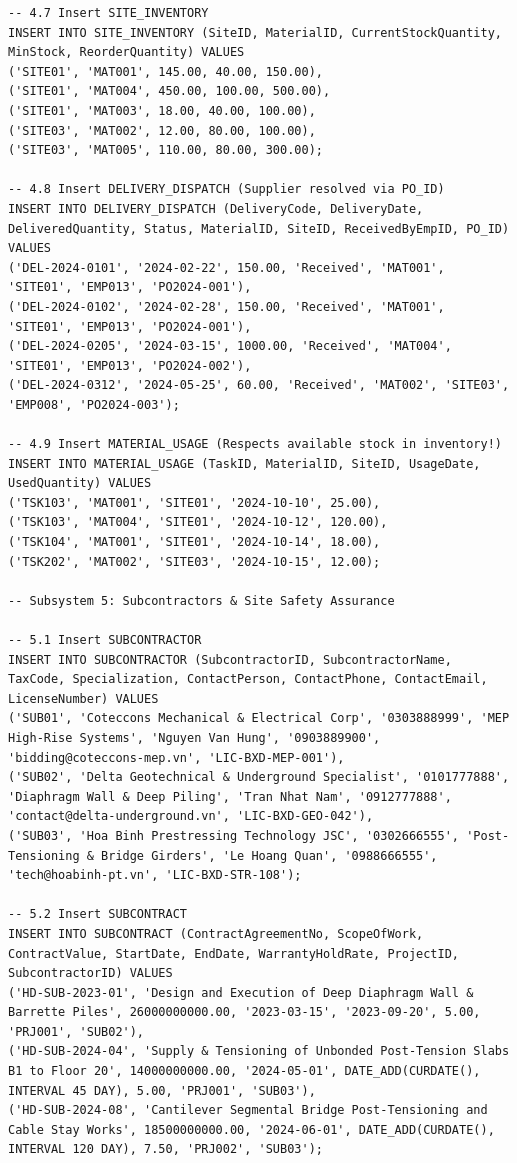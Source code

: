 \documentclass[a4paper,12pt]{report}
\begin{document}
\begin{lstlisting}
-- 4.7 Insert SITE_INVENTORY
INSERT INTO SITE_INVENTORY (SiteID, MaterialID, CurrentStockQuantity, MinStock, ReorderQuantity) VALUES
('SITE01', 'MAT001', 145.00, 40.00, 150.00),
('SITE01', 'MAT004', 450.00, 100.00, 500.00),
('SITE01', 'MAT003', 18.00, 40.00, 100.00),
('SITE03', 'MAT002', 12.00, 80.00, 100.00),
('SITE03', 'MAT005', 110.00, 80.00, 300.00);

-- 4.8 Insert DELIVERY_DISPATCH (Supplier resolved via PO_ID)
INSERT INTO DELIVERY_DISPATCH (DeliveryCode, DeliveryDate, DeliveredQuantity, Status, MaterialID, SiteID, ReceivedByEmpID, PO_ID) VALUES
('DEL-2024-0101', '2024-02-22', 150.00, 'Received', 'MAT001', 'SITE01', 'EMP013', 'PO2024-001'),
('DEL-2024-0102', '2024-02-28', 150.00, 'Received', 'MAT001', 'SITE01', 'EMP013', 'PO2024-001'),
('DEL-2024-0205', '2024-03-15', 1000.00, 'Received', 'MAT004', 'SITE01', 'EMP013', 'PO2024-002'),
('DEL-2024-0312', '2024-05-25', 60.00, 'Received', 'MAT002', 'SITE03', 'EMP008', 'PO2024-003');

-- 4.9 Insert MATERIAL_USAGE (Respects available stock in inventory!)
INSERT INTO MATERIAL_USAGE (TaskID, MaterialID, SiteID, UsageDate, UsedQuantity) VALUES
('TSK103', 'MAT001', 'SITE01', '2024-10-10', 25.00),
('TSK103', 'MAT004', 'SITE01', '2024-10-12', 120.00),
('TSK104', 'MAT001', 'SITE01', '2024-10-14', 18.00),
('TSK202', 'MAT002', 'SITE03', '2024-10-15', 12.00);

-- Subsystem 5: Subcontractors & Site Safety Assurance

-- 5.1 Insert SUBCONTRACTOR
INSERT INTO SUBCONTRACTOR (SubcontractorID, SubcontractorName, TaxCode, Specialization, ContactPerson, ContactPhone, ContactEmail, LicenseNumber) VALUES
('SUB01', 'Coteccons Mechanical & Electrical Corp', '0303888999', 'MEP High-Rise Systems', 'Nguyen Van Hung', '0903889900', 'bidding@coteccons-mep.vn', 'LIC-BXD-MEP-001'),
('SUB02', 'Delta Geotechnical & Underground Specialist', '0101777888', 'Diaphragm Wall & Deep Piling', 'Tran Nhat Nam', '0912777888', 'contact@delta-underground.vn', 'LIC-BXD-GEO-042'),
('SUB03', 'Hoa Binh Prestressing Technology JSC', '0302666555', 'Post-Tensioning & Bridge Girders', 'Le Hoang Quan', '0988666555', 'tech@hoabinh-pt.vn', 'LIC-BXD-STR-108');

-- 5.2 Insert SUBCONTRACT
INSERT INTO SUBCONTRACT (ContractAgreementNo, ScopeOfWork, ContractValue, StartDate, EndDate, WarrantyHoldRate, ProjectID, SubcontractorID) VALUES
('HD-SUB-2023-01', 'Design and Execution of Deep Diaphragm Wall & Barrette Piles', 26000000000.00, '2023-03-15', '2023-09-20', 5.00, 'PRJ001', 'SUB02'),
('HD-SUB-2024-04', 'Supply & Tensioning of Unbonded Post-Tension Slabs B1 to Floor 20', 14000000000.00, '2024-05-01', DATE_ADD(CURDATE(), INTERVAL 45 DAY), 5.00, 'PRJ001', 'SUB03'),
('HD-SUB-2024-08', 'Cantilever Segmental Bridge Post-Tensioning and Cable Stay Works', 18500000000.00, '2024-06-01', DATE_ADD(CURDATE(), INTERVAL 120 DAY), 7.50, 'PRJ002', 'SUB03');


\end{lstlisting}
\end{document}

